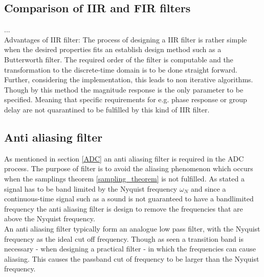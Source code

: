\subsection{Comparison of IIR and FIR filters}
... \\
Advantages of IIR filter:
The process of designing a IIR filter is rather simple when the desired properties fits an establish design method such as a Butterworth filter. The required order of the filter is computable and the transformation to the discrete-time domain is to be done straight forward. Further, considering the implementation, this leads to non iterative algorithms. \\
Though by this method the magnitude response is the only parameter to be specified. Meaning that specific requirements for e.g. phase response or group delay are not quarantined to be fulfilled by this kind of IIR filter.

\subsection{Anti aliasing filter}
As mentioned in section \ref{ADC} an anti aliasing filter is required in the ADC process. The purpose of filter is to avoid the aliasing phenomenon which occurs when the samplings theorem \ref{sampling_theorem} is not fulfilled. As stated a signal has to be band limited by the Nyquist frequency $\omega_N$ and since a continuous-time signal such as a sound is not guaranteed to have a bandlimited frequency the anti aliasing filter is design to remove the frequencies that are above the Nyquist frequency. \\
An anti aliasing filter typically form an analogue low pass filter, with the Nyquist frequency as the ideal cut off frequency. Though as seen a transition band is necessary - when designing a practical filter - in which the frequencies can cause aliasing. This causes the passband cut of frequency to be larger than the Nyquist frequency.           

